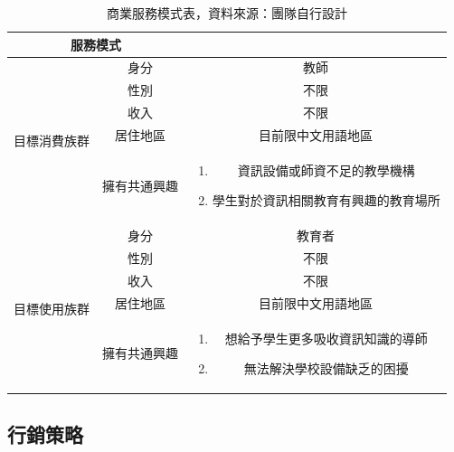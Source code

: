 \begin{table}[H]
  \centering
  \begin{tabular}{|c|c|c|}
    \hline
    \multicolumn{2}{|c|}{服務模式} & \\
    \hline
    \multirow{5}{*}{目標消費族群} & 身分 & 教師 \\
    \cline{2-3}
    ~ & 性別 & 不限 \\
    \cline{2-3}
    ~ & 收入 & 不限 \\
    \cline{2-3}
    ~ & 居住地區 & 目前限中文用語地區 \\
    \cline{2-3}
    ~ & 擁有共通興趣 &
    \begin{minipage}[c]{0.5\columnwidth}
      \vspace{0.5em}
      \begin{enumerate}[label=(\arabic*)]
        \setlength{\parindent}{1em}
        \item 資訊設備或師資不足的教學機構
        \item 學生對於資訊相關教育有興趣的教育場所
      \end{enumerate}
      \vspace{0.1em}
    \end{minipage} \\
    \hline
    \multirow{5}{*}{目標使用族群} & 身分 & 教育者 \\
    \cline{2-3}
    ~ & 性別 & 不限 \\
    \cline{2-3}
    ~ & 收入 & 不限 \\
    \cline{2-3}
    ~ & 居住地區 & 目前限中文用語地區 \\
    \cline{2-3}
    ~ & 擁有共通興趣 & 
      \begin{minipage}[c]{0.45\columnwidth}
        \vspace{0.5em}
        \begin{enumerate}[label=(\arabic*)]
          \setlength{\parindent}{2em}
          \item 想給予學生更多吸收資訊知識的導師
          \item 無法解決學校設備缺乏的困擾
        \end{enumerate}
        \vspace{0.1em}
      \end{minipage} \\
    \hline
  \end{tabular}
  \caption{商業服務模式表，資料來源：團隊自行設計}
\end{table}
\newpage
\subsection{行銷策略}

